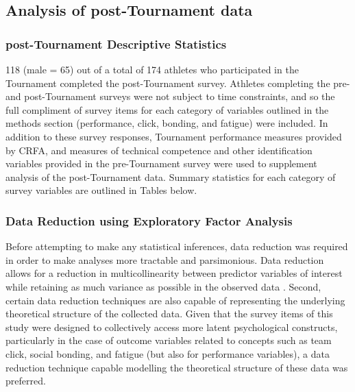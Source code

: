 \documentclass[12pt]{report}
\begin{document}
\subsection{Analysis of post-Tournament data}


\subsubsection{post-Tournament Descriptive Statistics}

118 (male = 65) out of a total of 174 athletes who participated in the Tournament completed the post-Tournament survey. Athletes completing the pre- and post-Tournament surveys were not subject to time constraints, and so the full compliment of survey items for each category of variables outlined in the methods section (performance, click, bonding, and fatigue) were included. In addition to these survey responses, Tournament performance measures provided by CRFA, and measures of technical competence and other identification variables provided in the pre-Tournament survey were used to supplement analysis of the post-Tournament data. Summary statistics for each category of survey variables are outlined in Tables below.








\clearpage

\subsubsection{Data Reduction using Exploratory Factor Analysis}

Before attempting to make any statistical inferences, data reduction was required in order to make analyses more tractable and parsimonious. Data reduction allows for a reduction in multicollinearity between predictor variables of interest while retaining as much variance as possible in the observed data \citep{Yong2013}. Second, certain data reduction techniques are also capable of representing the underlying theoretical structure of the collected data. Given that the survey items of this study were designed to collectively access more latent psychological constructs, particularly in the case of outcome variables related to concepts such as team click, social bonding, and fatigue (but also for performance variables), a data reduction technique capable modelling the theoretical structure of these data was preferred.
\end{document}
